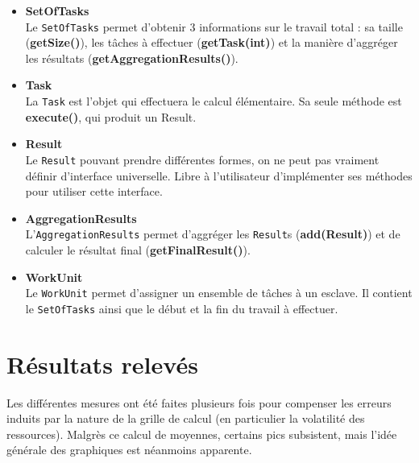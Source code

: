 \documentclass[oneside,10pt]{article}
\begin{document}
\begin{itemize}

\item \textbf{SetOfTasks}\\
Le \verb+SetOfTasks+ permet d'obtenir 3 informations sur le travail total :
sa taille (\textbf{getSize()}),
les t\^aches \`a effectuer (\textbf{getTask(int)}) et
la mani\`ere d'aggr\'eger les r\'esultats (\textbf{getAggregationResults()}).

\item \textbf{Task}\\
La \verb+Task+ est l'objet qui effectuera le calcul \'el\'ementaire.
Sa seule m\'ethode est \textbf{execute()}, qui produit un Result. 

\item \textbf{Result}\\
Le \verb+Result+ pouvant prendre diff\'erentes formes, on ne peut pas vraiment d\'efinir d'interface universelle.
Libre \`a l'utilisateur d'impl\'ementer ses m\'ethodes pour utiliser cette interface.

\item \textbf{AggregationResults}\\
L'\verb+AggregationResults+ permet d'aggr\'eger les \verb+Result+s (\textbf{add(Result)}) et de calculer le r\'esultat final (\textbf{getFinalResult()}).

\item \textbf{WorkUnit}\\
Le \verb+WorkUnit+ permet d'assigner un ensemble de t\^aches \`a un esclave.
Il contient le \verb+SetOfTasks+ ainsi que le d\'ebut et la fin du travail \`a effectuer.

\end{itemize}

\section{R\'esultats relev\'es}
Les diff\'erentes mesures ont \'et\'e faites plusieurs fois pour compenser les erreurs induits par la nature de la grille de calcul (en particulier la volatilit\'e des ressources).
Malgr\`es ce calcul de moyennes, certains pics subsistent, mais l'id\'ee g\'en\'erale des graphiques est n\'eanmoins apparente.
\end{document}
